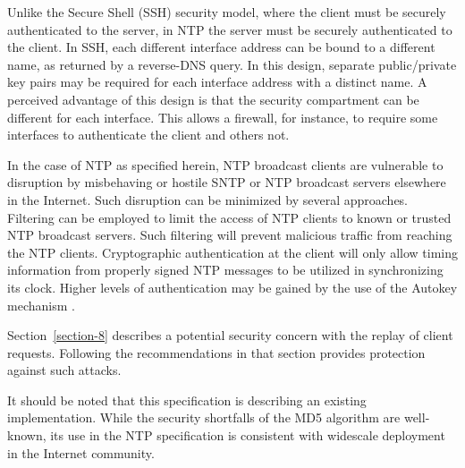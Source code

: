 Unlike the Secure Shell (SSH) security model, where the client must
be securely authenticated to the server, in NTP the server must be
securely authenticated to the client.  In SSH, each different
interface address can be bound to a different name, as returned by a
reverse-DNS query.  In this design, separate public/private key pairs
may be required for each interface address with a distinct name.  A
perceived advantage of this design is that the security compartment
can be different for each interface.  This allows a firewall, for
instance, to require some interfaces to authenticate the client and
others not.

In the case of NTP as specified herein, NTP broadcast clients are
vulnerable to disruption by misbehaving or hostile SNTP or NTP
broadcast servers elsewhere in the Internet.  Such disruption can be
minimized by several approaches.  Filtering can be employed to limit
the access of NTP clients to known or trusted NTP broadcast servers.
Such filtering will prevent malicious traffic from reaching the NTP
clients.  Cryptographic authentication at the client will only allow
timing information from properly signed NTP messages to be utilized
in synchronizing its clock.  Higher levels of authentication may be
gained by the use of the Autokey mechanism \cite{RFC5906}.

Section~\ref{section-8} describes a potential security concern with the replay of
client requests.  Following the recommendations in that section
provides protection against such attacks.

It should be noted that this specification is describing an existing
implementation.  While the security shortfalls of the MD5 algorithm
are well-known, its use in the NTP specification is consistent with
widescale deployment in the Internet community.
